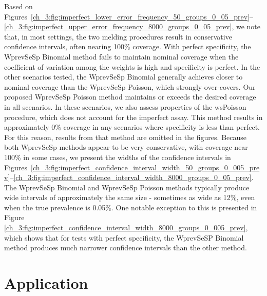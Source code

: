 Based on Figures~\ref{ch_3:fig:imperfect_lower_error_frequency_50_groups_0_05_prev}--\ref{ch_3:fig:imperfect_upper_error_frequency_8000_groups_0_05_prev}, we note that, in most settings, the two melding procedures result in conservative confidence intervals, often nearing 100\% coverage.
With perfect specificity, the WprevSeSp Binomial method fails to maintain nominal coverage when the coefficient of variation among the weights is high and specificity is perfect.
In the other scenarios tested, the WprevSeSp Binomial generally achieves closer to nominal coverage than the WprevSeSp Poisson, which strongly over-covers.
Our proposed WprevSeSp Poisson method maintains or exceeds the desired coverage in all scenarios.
In these scenarios, we also assess properties of the wsPoisson procedure, which does not account for the imperfect assay.
This method results in approximately 0\% coverage in any scenarios where specificity is less than perfect.
For this reason, results from that method are omitted in the figures.
Because both WprevSeSp methods appear to be very conservative, with coverage near 100\% in some cases, we present the widths of the confidence intervals in Figures~\ref{ch_3:fig:imperfect_confidence_interval_width_50_groups_0_005_prev}--\ref{ch_3:fig:imperfect_confidence_interval_width_8000_groups_0_05_prev}.
The WprevSeSp Binomial and WprevSeSp Poisson methods typically produce wide intervals of approximately the same size - sometimes as wide as 12\%, even when the true prevalence is 0.05\%.
One notable exception to this is presented in Figure \ref{ch_3:fig:imperfect_confidence_interval_width_8000_groups_0_005_prev}, which shows that for tests with perfect specificity, the WprevSeSP Binomial method produces much narrower confidence intervals than the other method.

\section{Application}
\label{ch_3:sec-Application}

